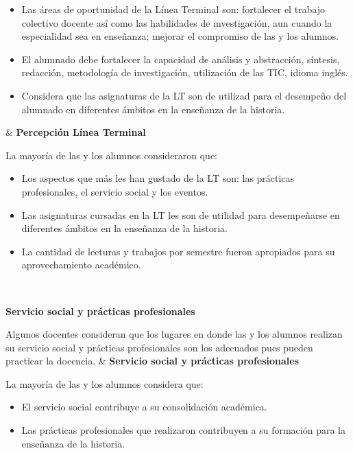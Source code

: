 \begin{center}
\begin{tiny}
\begin{longtabu*}
\begin{itemize}
\item  Las áreas de oportunidad de la Línea Terminal son: fortalecer el
trabajo colectivo docente así como las habilidades de investigación, aun cuando la especialidad sea en enseñanza; mejorar el compromiso de las y los alumnos.

\item El alumnado debe fortalecer la capacidad de análisis y abstracción,
síntesis, redacción, metodología de investigación, utilización de las TIC, idioma inglés.

\item Considera que las asignaturas de la LT son de utilizad para el
desempeño del alumnado en diferentes ámbitos en la enseñanza de la historia. 
\end{itemize}
&
{\bf Percepción Línea Terminal}

La mayoría de las y los alumnos consideraron que: 

\begin{itemize}
\item Los aspectos que más les han gustado de la LT son: las prácticas
profesionales, el servicio social y los eventos. 
\item Las asignaturas cursadas en la LT les son de utilidad para
desempeñarse en diferentes ámbitos en la enseñanza de la historia.
\item  La cantidad de lecturas y trabajos por semestre fueron apropiados
para su aprovechamiento académico. 
\end{itemize} \\
\addlinespace 
 
 {\bf Servicio social y prácticas profesionales}

Algunos docentes consideran que los lugares en donde las y los alumnos
realizan su servicio social y prácticas profesionales son los adecuados pues pueden practicar la docencia. 
&
{\bf Servicio social y prácticas profesionales}

La mayoría de las y los alumnos considera que:

\begin{itemize}
\item El servicio social contribuye a su consolidación académica.
\item Las prácticas profesionales que realizaron contribuyen a su
formación para la enseñanza de la historia. 
\end{itemize} \\
\addlinespace
\bottomrule
\end{longtabu*}

\end{tiny}\end{center}
\normalsize
\newpage

